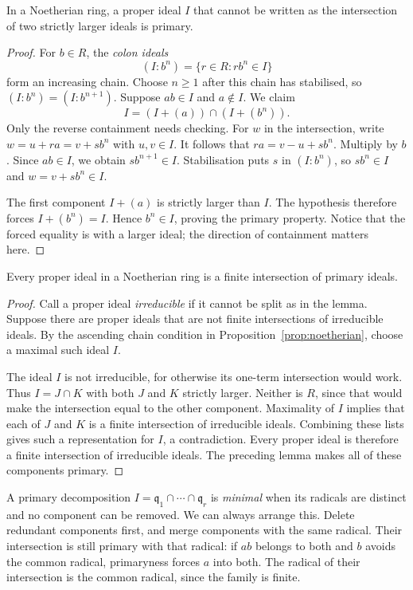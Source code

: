 \begin{lemma}\label{lem:irredprimary}
In a Noetherian ring, a proper ideal $I$ that cannot be written as the intersection of two strictly larger ideals is primary.
\end{lemma}

\begin{proof}
For $b\in R$, the \emph{colon ideals}
\[
 (I:b^n)=\{r\in R:rb^n\in I\}
\]
form an increasing chain. Choose $n\ge1$ after this chain has stabilised, so $(I:b^n)=(I:b^{n+1})$. Suppose $ab\in I$ and $a\notin I$. We claim
\[
 I=(I+(a))\cap(I+(b^n)).
\]
Only the reverse containment needs checking. For $w$ in the intersection, write $w=u+ra=v+sb^n$ with $u,v\in I$. It follows that $ra=v-u+sb^n$. Multiply by $b$. Since $ab\in I$, we obtain $sb^{n+1}\in I$. Stabilisation puts $s$ in $(I:b^n)$, so $sb^n\in I$ and $w=v+sb^n\in I$.

The first component $I+(a)$ is strictly larger than $I$. The hypothesis therefore forces $I+(b^n)=I$. Hence $b^n\in I$, proving the primary property. Notice that the forced equality is with a larger ideal; the direction of containment matters here.
\end{proof}

\begin{theorem}\label{thm:laskernoether}
Every proper ideal in a Noetherian ring is a finite intersection of primary ideals.
\end{theorem}

\begin{proof}
Call a proper ideal \emph{irreducible} if it cannot be split as in the lemma. Suppose there are proper ideals that are not finite intersections of irreducible ideals. By the ascending chain condition in Proposition~\ref{prop:noetherian}, choose a maximal such ideal $I$.

The ideal $I$ is not irreducible, for otherwise its one-term intersection would work. Thus $I=J\cap K$ with both $J$ and $K$ strictly larger. Neither is $R$, since that would make the intersection equal to the other component. Maximality of $I$ implies that each of $J$ and $K$ is a finite intersection of irreducible ideals. Combining these lists gives such a representation for $I$, a contradiction. Every proper ideal is therefore a finite intersection of irreducible ideals. The preceding lemma makes all of these components primary.
\end{proof}

A primary decomposition $I=\mathfrak q_1\cap\cdots\cap\mathfrak q_r$ is \emph{minimal} when its radicals are distinct and no component can be removed. We can always arrange this. Delete redundant components first, and merge components with the same radical. Their intersection is still primary with that radical: if $ab$ belongs to both and $b$ avoids the common radical, primaryness forces $a$ into both. The radical of their intersection is the common radical, since the family is finite.

